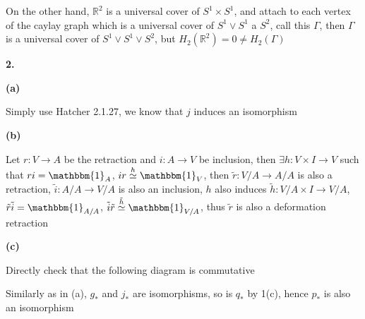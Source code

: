 \documentclass[12pt]{article}
\begin{document}
On the other hand, $\mathbb{R}^2$ is a universal cover of $S^1\times S^1$, and attach to each vertex of the caylay graph which is a universal cover of $S^1\vee S^1$ a $S^2$, call this $\Gamma$, then $\Gamma$ is a universal cover of  $S^1\vee S^1\vee S^2$, but $H_2(\mathbb{R}^2)=0\neq H_2(\Gamma)$ \par
\textbf{2.} \par
\textbf{(a)} \par
Simply use Hatcher 2.1.27, we know that $j$ induces an isomorphism \par
\textbf{(b)} \par
Let $r:V\rightarrow A$ be the retraction and $i:A\rightarrow V$ be inclusion, then $\exists h:V\times I\rightarrow V$ such that $ri=\mathbbm{1}_A$, $ir\overset{h}{\simeq}\mathbbm{1}_V$, then $\tilde{r}:V/A\rightarrow A/A$ is also a retraction, $\tilde{i}:A/A\rightarrow V/A$ is also an inclusion, $h$ also induces $\tilde{h}:V/A\times I\rightarrow V/A$, $\tilde{r}\tilde{i}=\mathbbm{1}_{A/A}$, $\tilde{i}\tilde{r}\overset{\tilde{h}}{\simeq}\mathbbm{1}_{V/A}$, thus $\tilde{r}$ is also a deformation retraction \par
\textbf{(c)} \par
Directly check that the following diagram is commutative \par
\begin{center}
\end{center}
\par
Similarly as in (a), $g_*$ and $j_*$ are isomorphisms, so is $q_*$ by 1(c), hence $p_*$ is also an isomorphism \par
\end{document}
